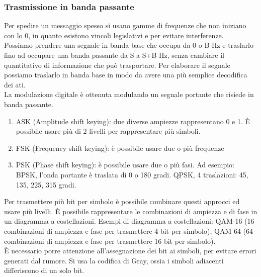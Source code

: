 \documentclass{article}
\begin{document}
		\subsubsection{Trasmissione in banda passante}
		Per spedire un messaggio spesso si usano gamme di frequenze che non iniziano con lo 0, in quanto esistono vincoli legislativi e per evitare interferenze.\\
		Possiamo prendere una segnale in banda base che occupa da 0 o B Hz e traslarlo fino ad occupare una banda passante da S a S+B Hz, senza cambiare il quantitativo di informazione che può trasportare. Per elaborare il segnale possiamo traslarlo in banda base in modo da avere una più semplice decodifica dei ati.\\
		La modulazione digitale è ottenuta modulando un segnale portante che risiede in banda passante. 
		\begin{enumerate}
			\item ASK (Amplitude shift keying): due diverse ampiezze rappresentano 0 e 1. È possibile usare più di 2 livelli per rappresentare più simboli.
			\item FSK (Frequency shift keying): è possibile usare due o più frequenze
			\item PSK (Phase shift keying): è possibile usare due o più fasi. Ad esempio: BPSK, l'onda portante è traslata di 0 o 180 gradi. QPSK, 4 traslazioni: 45, 135, 225, 315 gradi. 
		\end{enumerate}
		Per trasmettere più bit per simbolo è possibile combinare questi approcci ed usare più livelli. È possibile rappresentare le combinazioni di ampiezza e di fase in un diagramma a costellazioni. Esempi di diagramma a costellazioni: QAM-16 (16 combinazioni di ampiezza e fase per trasmettere 4 bit per simbolo), QAM-64 (64 combinazioni di ampiezza e fase per trasmettere 16 bit per simbolo).\\
		È necessario porre attenzione all'assegnazione dei bit ai simboli, per evitare errori generati dal rumore.  Si usa la codifica di Gray, ossia i simboli adiacenti differiscono di un solo bit. 
\end{document}
